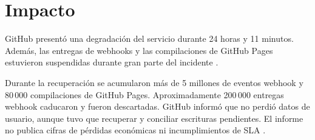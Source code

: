 
\section{Impacto}
\label{sec:impacto}

GitHub presentó una degradación del servicio durante 24 horas y 11 minutos. Además, las entregas de webhooks y las compilaciones de GitHub Pages estuvieron suspendidas durante gran parte del incidente \cite{Warner2018}.

Durante la recuperación se acumularon más de 5 millones de eventos webhook y 80\,000 compilaciones de GitHub Pages. Aproximadamente 200\,000 entregas webhook caducaron y fueron descartadas. GitHub informó que no perdió datos de usuario, aunque tuvo que recuperar y conciliar escrituras pendientes. El informe no publica cifras de pérdidas económicas ni incumplimientos de SLA \cite{Warner2018}.

